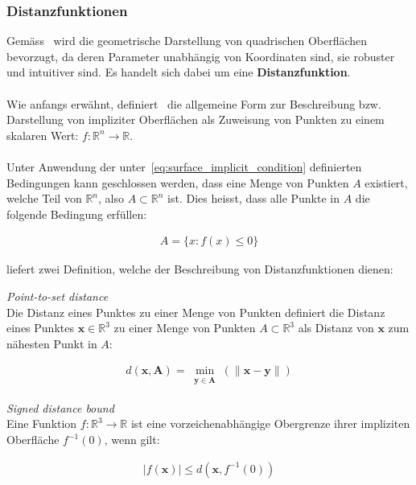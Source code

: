 \subsubsection{Distanzfunktionen}
\label{ssubsec:distance_functions}

Gemäss~\cite{hart_sphere_1994} wird die geometrische Darstellung von
quadrischen Oberflächen bevorzugt, da deren Parameter unabhängig von
Koordinaten sind, sie robuster und intuitiver sind. Es handelt sich dabei um
eine \textbf{Distanzfunktion}.\\
\\
Wie anfangs erwähnt, definiert~\cite{hart_sphere_1994} die allgemeine Form zur
Beschreibung bzw. Darstellung von impliziter Oberflächen als Zuweisung von
Punkten zu einem skalaren Wert: $ f : \mathbb{R}^{n} \to \mathbb{R} $.\\
\\
Unter Anwendung der unter~\ref{eq:surface_implicit_condition} definierten
Bedingungen kann geschlossen werden, dass eine Menge von Punkten $A$ existiert,
welche Teil von $\mathbb{R}^{n}$, also $A \subset \mathbb{R}^{n}$ ist. Dies heisst, dass alle Punkte in $A$ die folgende Bedingung erfüllen:

\begin{gather}
    A = \{ x : f(x) \leq 0 \}
\end{gather}

\cite{hart_sphere_1994} liefert zwei Definition, welche der Beschreibung von Distanzfunktionen dienen:

\theoremstyle{definition}
\begin{definition}{\label{theo:point_to_set_distance}
    \textit{Point-to-set distance}}\\
    Die Distanz eines Punktes zu einer Menge von Punkten definiert die Distanz
    eines Punktes $ \bm{x} \in \mathbb{R}^{3} $ zu einer Menge von Punkten $A
    \subset \mathbb{R}^{3}$ als Distanz von $\bm{x}$ zum nähesten Punkt in $A$:

    \begin{gather}
        d(\bm{x}, \bm{A}) = \min_{\substack{\bm{y} \in \bm{A}}}(\|\bm{x} - \bm{y}\|)
    \end{gather}
\end{definition}

\theoremstyle{definition}
\begin{definition}{\label{theo:signed_distnace_bound}
    \textit{Signed distance bound}}\\ 
    Eine Funktion $ f : \mathbb{R}^{3} \to \mathbb{R} $ ist eine
    vorzeichenabhängige Obergrenze ihrer impliziten Oberfläche $ f^{-1}(0)$,
    wenn gilt:

    \begin{gather}\label{eq:signed_distnace_bound}
        |f(\bm{x})| \leq d(\bm{x}, f^{-1}(0))
    \end{gather}
\end{definition}

